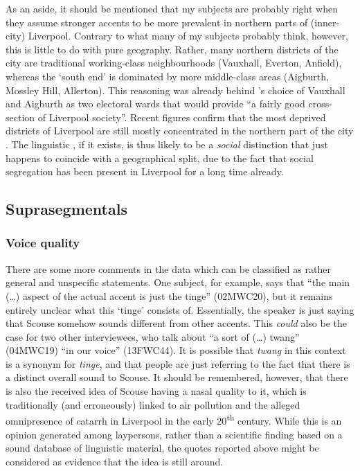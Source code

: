 As an aside, it should be mentioned that my subjects are probably right when they assume stronger accents to be more prevalent in northern parts of (inner-city) Liverpool.
Contrary to what many of my subjects probably think, however, this is little to do with pure geography.
Rather, many northern districts of the city are traditional working-class neighbourhoods (Vauxhall, Everton, Anfield), whereas the `south end' is dominated by more middle-class areas (Aigburth, Mossley Hill, Allerton).
This reasoning was already behind \citeauthor{knowles1973}'s choice of Vauxhall and Aigburth as two electoral wards that would provide ``a fairly good cross-section of Liverpool society''\parencite[2]{knowles1973}.
Recent figures confirm that the most deprived districts of Liverpool are still mostly concentrated in the northern part of the city \parencite[cf.][iii]{lcc2010}.
The linguistic , if it exists, is thus likely to be a \emph{social} distinction that just happens to coincide with a geographical split, due to the fact that social segregation has been present in Liverpool for a long time already.

\subsection{Suprasegmentals}
\label{sec.qual.supra}

\subsubsection{Voice quality}

There are some more comments in the data which can be classified as rather general and unspecific statements.
One subject, for example, says that ``the main (\ldots) aspect of the actual accent is just the tinge'' (02MWC20), but it remains entirely unclear what this `tinge' consists of.
Essentially, the speaker is just saying that Scouse somehow sounds different from other accents.
This \emph{could} also be the case for two other interviewees, who talk about ``a sort of (\ldots) twang'' (04MWC19) ``in our voice'' (13FWC44).
It is possible that \emph{twang} in this context is a synonym for \emph{tinge}, and that people are just referring to the fact that there is a distinct overall sound to Scouse.
It should be remembered, however, that there is also the received idea of Scouse having a nasal quality to it, which is traditionally (and erroneously) linked to air pollution and the alleged omnipresence of catarrh in Liverpool in the early 20\textsuperscript{th} century.
While this is an opinion generated among laypersons, rather than a scientific finding based on a sound database of linguistic material, the quotes reported above might be considered as evidence that the idea is still around.

